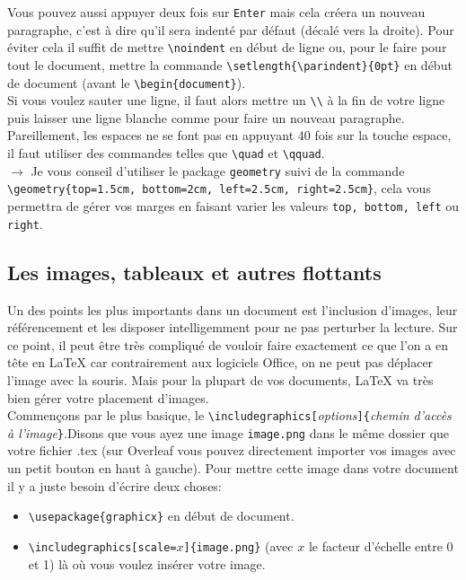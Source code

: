 \documentclass[11pt]{article}				%
\newcommand{\tb}{\textbackslash}
\newcommand{\cmdo}[3][]{\texttt{\textbackslash #2}\texttt{[#1}\texttt{]\{#3\}}}
\newcommand{\cmdoi}[3][]{\texttt{\textbackslash #2}\texttt{[}\textit{#1}\texttt{]\{}\textit{#3}\texttt{\}}}
\newcommand{\cmd}[2]{\texttt{\textbackslash #1}\texttt{\{#2\}}}
\begin{document}
Vous pouvez aussi appuyer deux fois sur \texttt{Enter} mais cela créera un nouveau paragraphe, c'est à dire qu'il sera indenté par défaut (décalé vers la droite). Pour éviter cela il suffit de mettre \texttt{\tb noindent} en début de ligne ou, pour le faire pour tout le document, mettre la commande \texttt{\tb setlength\{\tb parindent\}\{0pt\}} en début de document (avant le \texttt{\tb begin\{document\}}).\\
Si vous voulez sauter une ligne, il faut alors mettre un \texttt{\tb \tb} à la fin de votre ligne puis laisser une ligne blanche comme pour faire un nouveau paragraphe.\\
Pareillement, les espaces ne se font pas en appuyant 40 fois sur la touche espace, il faut utiliser des commandes telles que \texttt{\tb quad} et \texttt{\tb qquad}.\\

$\rightarrow$ Je vous conseil d'utiliser le package \texttt{geometry} suivi de la commande\\ \verb|\geometry{top=1.5cm, bottom=2cm, left=2.5cm, right=2.5cm}|, cela vous permettra de gérer vos marges en faisant varier les valeurs \texttt{top, bottom, left} ou \texttt{right}.

\subsection*{Les images, tableaux et autres flottants}

Un des points les plus importants dans un document est l'inclusion d'images, leur référencement et les disposer intelligemment pour ne pas perturber la lecture. Sur ce point, il peut être très compliqué de vouloir faire exactement ce que l'on a en tête en LaTeX car contrairement aux logiciels Office, on ne peut pas déplacer l'image avec la souris.
Mais pour la plupart de vos documents, LaTeX va très bien gérer votre placement d'images.\\

Commençons par le plus basique, le \cmdoi[options]{includegraphics}{\textit{chemin d'accès à l'image}}.Disons que vous ayez une image \texttt{image.png} dans le même dossier que votre fichier .tex (sur Overleaf vous pouvez directement importer vos images avec un petit bouton en haut à gauche). Pour mettre cette image dans votre document il y a juste besoin d'écrire deux choses: \\

\begin{itemize}
	\item \cmd{usepackage}{graphicx} en début de document.
	\item \cmdo[scale=$x$]{includegraphics}{image.png} \quad (avec $x$ le facteur d'échelle entre 0 et 1) là où vous voulez insérer votre image.
\end{itemize}
\end{document}
